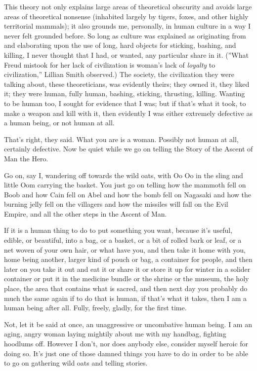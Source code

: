This theory not only explains large areas of
theoretical obscurity and avoids large areas of
theoretical nonsense (inhabited largely by tigers,
foxes, and other highly territorial mammals); it
also grounds me, personally, in human culture in
a way I never felt grounded before. So long as
culture was explained as originating from and
elaborating upon the use of long, hard objects for
sticking, bashing, and killing, I never thought that
I had, or wanted, any particular share in it.
(''What Freud mistook for her lack of civilization
is woman’s lack of \textit{loyalty} to civilization,'' Lillian
Smith observed.) The society, the civilization
they were talking about, these theoreticians, was
evidently theirs; they owned it, they liked it; they
were human, fully human, bashing, sticking,
thrusting, killing. Wanting to be human too, I
sought for evidence that I was; but if that’s what
it took, to make a weapon and kill with it, then
evidently I was either extremely defective as a
human being, or not human at all.

That’s right, they said. What you are is a
woman. Possibly not human at all, certainly
defective. Now be quiet while we go on telling
the Story of the Ascent of Man the Hero.

Go on, say I, wandering off towards the wild
oats, with Oo Oo in the sling and little Oom
carrying the basket. You just go on telling how
the mammoth fell on Boob and how Cain fell on
Abel and how the bomb fell on Nagasaki and how
the burning jelly fell on the villagers and how the
missiles will fall on the Evil Empire, and all the
other steps in the Ascent of Man.

If it is a human thing to do to put something
you want, because it’s useful, edible, or beautiful,
into a bag, or a basket, or a bit of rolled bark or
leaf, or a net woven of your own hair, or what
have you, and then take it home with you, home
being another, larger kind of pouch or bag, a
container for people, and then later on you take
it out and eat it or share it or store it up for winter
in a solider container or put it in the medicine
bundle or the shrine or the museum, the holy
place, the area that contains what is sacred, and
then next day you probably do much the same
again if to do that is human, if that’s what it
takes, then I am a human being after all. Fully,
freely, gladly, for the first time.

Not, let it be said at once, an unaggressive or
uncombative human being. I am an aging, angry
woman laying mightily about me with my
handbag, fighting hoodlums off. However I don’t,
nor does anybody else, consider myself heroic
for doing so. It’s just one of those damned things
you have to do in order to be able to go on
gathering wild oats and telling stories.

